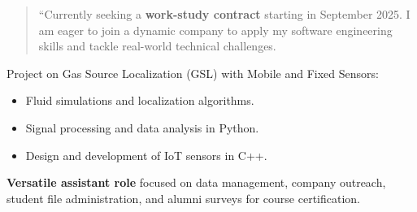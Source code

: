 \documentclass[10pt,a4paper,ragged2e,withhyper]{../AltaCV/altacv}
\begin{document}



\makecvheader


\begin{paracol}{2}

  \begin{quote}
    ``Currently seeking a \textbf{work-study contract} starting in September 2025.
    I am eager to join a dynamic company to apply my software engineering skills and tackle real-world technical challenges.
  \end{quote}



  \divider

  Project on Gas Source Localization (GSL) with Mobile and Fixed Sensors:
  \begin{itemize}
    \item Fluid simulations and localization algorithms.
    \item Signal processing and data analysis in Python.
    \item Design and development of IoT sensors in C++.
  \end{itemize}

  \divider


  \textbf{Versatile assistant role} focused on data management, company outreach, student file administration, and alumni surveys for course certification.

  \divider



\end{paracol}
\end{document}

